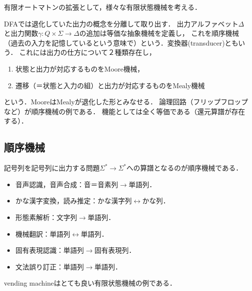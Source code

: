 \documentclass[uplatex, dvipdfmx]{jsreport}
\begin{document}
\begin{tcolorbox}[colframe=ForestGreen, colback=ForestGreen!10!white, breakable,
    title=オートマトンの変遷]
    有限オートマトンの拡張として，様々な有限状態機械を考える．

    DFAでは退化していた出力の概念を分離して取り出す．
    出力アルファベット$\Delta$と出力関数$\gamma:Q\times\Sigma\to\Delta$の追加は等価な抽象機械を定義し，
    これを順序機械（過去の入力を記憶しているという意味で）という．変換器(transducer)ともいう．
    これには出力の仕方について２種類存在し，
    \begin{enumerate}
        \item 状態と出力が対応するものをMoore機械\cite{Moore}，
        \item 遷移（＝状態と入力の組）と出力が対応するものをMealy機械\cite{Mealy}
    \end{enumerate}
    という．MooreはMealyが退化した形とみなせる．
    論理回路（フリップフロップなど）が順序機械の例である．
    機能としては全く等価である（還元算譜が存在する）．
\end{tcolorbox}

\subsection{順序機械}

\begin{tcolorbox}[colframe=ForestGreen, colback=ForestGreen!10!white, breakable,
    title=transducerの応用]
    記号列を記号列に出力する問題$\Sigma^*\rightarrow\Sigma^*$への算譜となるのが順序機械である．
    \begin{itemize}
        \item 音声認識，音声合成：音＝音素列$\rightarrow$単語列．
        \item かな漢字変換，読み推定：かな漢字列$\leftrightarrow$かな列．
        \item 形態素解析：文字列$\rightarrow$単語列．
        \item 機械翻訳：単語列$\leftrightarrow$単語列．
        \item 固有表現認識：単語列$\rightarrow$固有表現列．
        \item 文法誤り訂正：単語列$\rightarrow$単語列．
    \end{itemize}
\end{tcolorbox}

\begin{example}
    vending machineはとても良い有限状態機械の例である．
\end{example}
\end{document}
